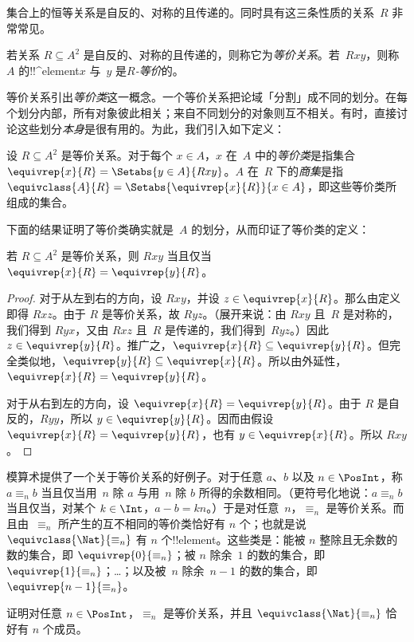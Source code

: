 \documentclass[../../../include/open-logic-section]{subfiles}
\begin{document}


集合上的恒等关系是自反的、对称的且传递的。同时具有这三条性质的关系~$R$ 非常常见。

\begin{defn}[等价关系]
若关系 $R \subseteq A^2$ 是自反的、对称的且传递的，则称它为\emph{等价关系}。若~$Rxy$，则称~$A$ 的!!^{element}$x$ 与~$y$ 是\emph{$R$-等价}的。
\end{defn}

等价关系引出\emph{等价类}这一概念。一个等价关系把论域「分割」成不同的划分。在每个划分内部，所有对象彼此相关；来自不同划分的对象则互不相关。有时，直接讨论这些划分\emph{本身}是很有用的。为此，我们引入如下定义：

\begin{defn}
设 $R \subseteq A^2$ 是等价关系。对于每个 $x \in A$，$x$ 在~$A$ 中的\emph{等价类}是指集合 $\equivrep{x}{R}
= \Setabs{y \in A}{Rxy}$。$A$ 在~$R$ 下的\emph{商集}是指 $\equivclass{A}{R} = \Setabs{\equivrep{x}{R}}{x \in A}$，即这些等价类所组成的集合。
\end{defn}

下面的结果证明了等价类确实就是~$A$ 的划分，从而印证了等价类的定义：

\begin{prop}
若 $R \subseteq A^2$ 是等价关系，则 $Rxy$ 当且仅当
$\equivrep{x}{R} = \equivrep{y}{R}$。
\end{prop}

\begin{proof}
对于从左到右的方向，设 $Rxy$，并设 $z \in
\equivrep{x}{R}$。那么由定义即得 $Rxz$。由于 $R$ 是等价关系，故 $Ryz$。（展开来说：由 $Rxy$ 且~$R$ 是对称的，我们得到 $Ryx$，又由 $Rxz$ 且~$R$ 是传递的，我们得到~$Ryz$。）因此 $z \in \equivrep{y}{R}$。推广之，$\equivrep{x}{R} \subseteq \equivrep{y}{R}$。但完全类似地，$\equivrep{y}{R} \subseteq \equivrep{x}{R}$。所以由外延性，$\equivrep{x}{R} =
\equivrep{y}{R}$。

对于从右到左的方向，设 $\equivrep{x}{R} =
\equivrep{y}{R}$。由于 $R$ 是自反的，$Ryy$，所以 $y \in
\equivrep{y}{R}$。因而由假设 $\equivrep{x}{R} = \equivrep{y}{R}$，也有 $y \in \equivrep{x}{R}$。所以 $Rxy$。
\end{proof}

\begin{ex}
模算术提供了一个关于等价关系的好例子。对于任意 $a$、$b$ 以及 $n \in \PosInt$，称 $a \equiv_n b$ 当且仅当用~$n$ 除 $a$ 与用~$n$ 除 $b$ 所得的余数相同。（更符号化地说：$a \equiv_n b$ 当且仅当，对某个 $k \in
\Int$，$a - b = kn$。）于是对任意~$n$，$\equiv_n$ 是等价关系。而且由~$\equiv_n$ 所产生的互不相同的等价类恰好有 $n$ 个；也就是说 $\equivclass{\Nat}{\equiv_n}$ 有 $n$ 个!!{element}。这些类是：能被 $n$ 整除且无余数的数的集合，即 $\equivrep{0}{\equiv_n}$；被 $n$ 除余~$1$ 的数的集合，即 $\equivrep{1}{\equiv_n}$；\ldots；以及被~$n$ 除余~$n-1$ 的数的集合，即~$\equivrep{n-1}{\equiv_n}$。
\end{ex}

\begin{prob}
证明对任意 $n \in
\PosInt$，$\equiv_n$ 是等价关系，并且 $\equivclass{\Nat}{\equiv_n}$ 恰好有 $n$ 个成员。
\end{prob}
\end{document}
